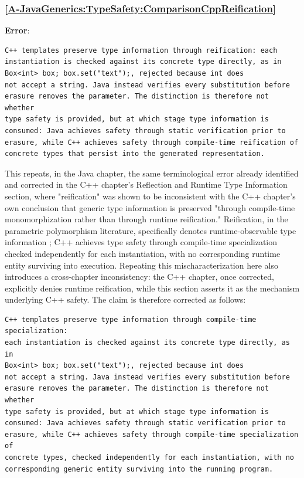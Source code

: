 \documentclass[11pt]{report}
\begin{document}
\subsubsection*{\hyperref[A-JavaGenerics:TypeSafety:ComparisonCppReification]{\ref*{A-JavaGenerics:TypeSafety:ComparisonCppReification} }}
\noindent\textbf{Error}:
\begin{Verbatim}[breaklines=true]
C++ templates preserve type information through reification: each
instantiation is checked against its concrete type directly, as in
Box<int> box; box.set("text");, rejected because int does
not accept a string. Java instead verifies every substitution before
erasure removes the parameter. The distinction is therefore not whether
type safety is provided, but at which stage type information is
consumed: Java achieves safety through static verification prior to
erasure, while C++ achieves safety through compile-time reification of
concrete types that persist into the generated representation.
\end{Verbatim}
This repeats, in the Java chapter, the same terminological error already
identified and corrected in the C++ chapter's Reflection and Runtime Type
Information section, where "reification" was shown to be inconsistent with
the C++ chapter's own conclusion that generic type information is preserved
"through compile-time monomorphization rather than through runtime
reification." Reification, in the parametric polymorphism literature,
specifically denotes runtime-observable type information
\cite{cardelli1985}; C++ achieves type safety through compile-time
specialization checked independently for each instantiation, with no
corresponding runtime entity surviving into execution. Repeating this
mischaracterization here also introduces a cross-chapter inconsistency: the
C++ chapter, once corrected, explicitly denies runtime reification, while
this section asserts it as the mechanism underlying C++ safety. The claim
is therefore corrected as follows:
\begin{Verbatim}[breaklines=true]
C++ templates preserve type information through compile-time specialization:
each instantiation is checked against its concrete type directly, as in
Box<int> box; box.set("text");, rejected because int does
not accept a string. Java instead verifies every substitution before
erasure removes the parameter. The distinction is therefore not whether
type safety is provided, but at which stage type information is
consumed: Java achieves safety through static verification prior to
erasure, while C++ achieves safety through compile-time specialization of
concrete types, checked independently for each instantiation, with no
corresponding generic entity surviving into the running program.
\end{Verbatim}
\end{document}
